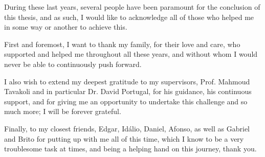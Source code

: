 \vspace{1cm}
\noindent

During these last years, several people have been paramount for the conclusion of this thesis, and as such, I would like to acknowledge all of those who helped me in some way or another to achieve this.

First and foremost, I want to thank my family, for their love and care, who supported and helped me throughout all these years, and without whom I would never be able to continuously push forward. 

I also wish to extend my deepest gratitude to my supervisors, Prof. Mahmoud Tavakoli and in particular Dr. David Portugal, for his guidance, his continuous support, and for giving me an opportunity to undertake this challenge and so much more; I will be forever grateful.

Finally, to my closest friends, Edgar, Idálio, Daniel, Afonso, as well as Gabriel and Brito for putting up with me all of this time, which I know to be a very troublesome task at times, and being a helping hand on this journey, thank you.